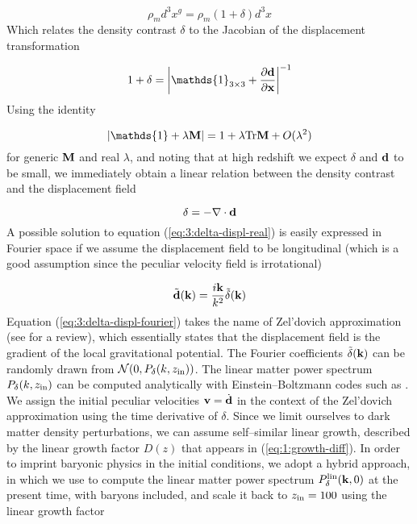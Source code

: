 \begin{equation}
\label{eq:3:masscons}
\rho_m d^3 x^g = \rho_m(1+\delta)d^3x
\end{equation} 
%
Which relates the density contrast $\delta$ to the Jacobian of the displacement transformation 

\begin{equation}
\label{eq:3:delta-displ}
1+\delta = \left\vert\mathds{1}_{3\times 3}+\frac{\partial \bb{d}}{\partial \bb{x}}\right\vert^{-1}
\end{equation}
%
Using the identity

\begin{equation}
\label{eq:3:det-identity}
\vert\mathds{1}+\lambda\bb{M}\vert = 1 + \lambda\Tr\bb{M} + O(\lambda^2)
\end{equation}
%
for generic $\mathbf{M}$ and real $\lambda$, and noting that at high redshift we expect $\delta$ and $\mathbf{d}$ to be small, we immediately obtain a linear relation between the density contrast and the displacement field 

\begin{equation}
\label{eq:3:delta-displ-real}
\delta = -\nabla\cdot\mathbf{d}
\end{equation}
%
A possible solution to equation (\ref{eq:3:delta-displ-real}) is easily expressed in Fourier space if we assume the displacement field to be longitudinal (which is a good assumption since the peculiar velocity field is irrotational)

\begin{equation}
\label{eq:3:delta-displ-fourier}
\tilde{\mathbf{d}}(\mathbf{k}) = \frac{i\mathbf{k}}{k^2}\tilde{\delta}(\mathbf{k})
\end{equation}
%
Equation (\ref{eq:3:delta-displ-fourier}) takes the name of Zel'dovich approximation (see \citep{ZeldovichWhite} for a review), which essentially states that the displacement field is the gradient of the local gravitational potential. The Fourier coefficients $\tilde{\delta}(\mathbf{k})$ can be randomly drawn from $\mathcal{N}(0,P_\delta(k,z_{\rm in}))$. The linear matter power spectrum $P_\delta(k,z_{\rm in})$ can be computed analytically with Einstein--Boltzmann codes such as  \citep{CAMB}. We assign the initial peculiar velocities $\mathbf{v}=\dot{\mathbf{d}}$ in the context of the Zel'dovich approximation using the time derivative of $\delta$. Since we limit ourselves to dark matter density perturbations, we can assume self--similar linear growth, described by the linear growth factor $D(z)$ that appears in (\ref{eq:1:growth-diff}). In order to imprint baryonic physics in the initial conditions, we adopt a hybrid approach, in which we use  to compute the linear matter power spectrum $P^{\rm lin}_\delta(\mathbf{k},0)$ at the present time, with baryons included, and scale it back to $z_{\rm in}=100$ using the linear growth factor

